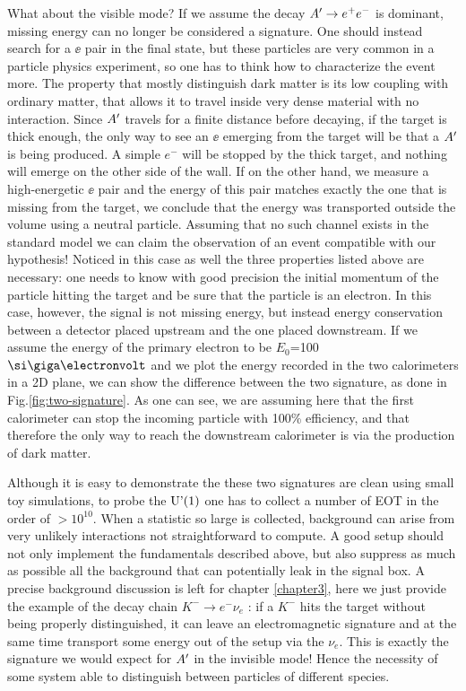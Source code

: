 What about the visible mode? If we assume the decay $A' \to e^+e^-$ is dominant, missing energy can no longer be considered a signature. One should instead search for a $\ee$ pair in the final state, but these particles are very common in a particle physics experiment, so one has to think how to characterize the event more. The property that mostly distinguish dark matter is its low coupling with ordinary matter, that allows it to travel inside very dense material with no interaction. Since $A'$ travels for a finite distance before decaying, if the target is thick enough, the only way to see an $\ee$ emerging from the target will be that a $A'$ is being produced. A simple $e^-$ will be stopped by the thick target, and nothing will emerge on the other side of the wall. If on the other hand, we measure a high-energetic $\ee$ pair and the energy of this pair matches exactly the one that is missing from the target, we conclude that the energy was transported outside the volume using a neutral particle. Assuming that no such channel exists in the standard model we can claim the observation of an event compatible with our hypothesis! Noticed in this case as well the three properties listed above are necessary: one needs to know with good precision the initial momentum of the particle hitting the target and be sure that the particle is an electron. In this case, however, the signal is not missing energy, but instead energy conservation between a detector placed upstream and the one placed downstream.
If we assume the energy of the primary electron to be $E_0$=100 $\gev$ and we plot the energy recorded in the two calorimeters in a 2D plane, we can show the difference between the two signature, as done in Fig.\ref{fig:two-signature}. As one can see, we are assuming here that the first calorimeter can stop the incoming particle with 100\% efficiency, and that therefore the only way to reach the downstream calorimeter is via the production of dark matter.

Although it is easy to demonstrate the these two signatures are clean using small toy simulations, to probe the $\textrm{U'(1)}$ one has to collect a number of EOT in the order of $>10^{10}$. When a statistic so large is collected, background can arise from very unlikely interactions not straightforward to compute. A good setup should not only implement the fundamentals described above, but also suppress as much as possible all the background that can potentially leak in the signal box. A precise background discussion is left for chapter \ref{chapter3}, here we just provide the example of the decay chain $K^- \to e^- \nu_e$ \cite{review-particle-physics}: if a $K^-$ hits the target without being properly distinguished, it can leave an electromagnetic signature and at the same time transport some energy out of the setup via the $\nu_e$. This is exactly the signature we would expect for $A'$ in the invisible mode! Hence the necessity of some system able to distinguish between particles of different species.

